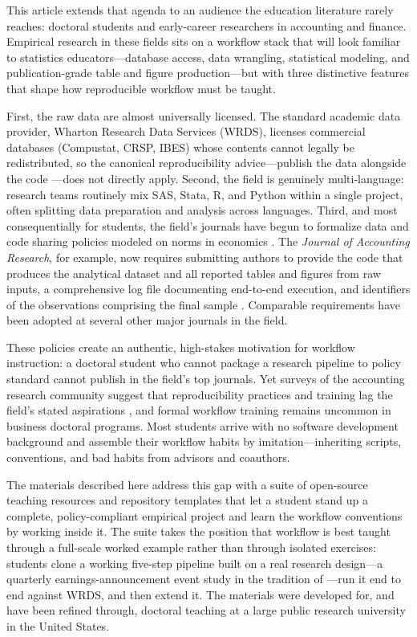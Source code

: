\documentclass[12pt]{article}
\newcommand{\institution}{a large public research university in the United States}
\newcommand{\institution}{the University of Kansas}
\begin{document}
This article extends that agenda to an audience the education literature
rarely reaches: doctoral students and early-career researchers in
accounting and finance. Empirical research in these fields sits on a
workflow stack that will look familiar to statistics educators---database
access, data wrangling, statistical modeling, and publication-grade table
and figure production---but with three distinctive features that shape
how reproducible workflow must be taught.

First, the raw data are almost universally licensed. The standard
academic data provider, Wharton Research Data Services (WRDS), licenses
commercial databases (Compustat, CRSP, IBES) whose contents cannot
legally be redistributed, so the canonical reproducibility
advice---publish the data alongside the code
\citep{peng2011reproducible}---does not directly apply. Second, the field
is genuinely multi-language: research teams routinely mix SAS, Stata, R,
and Python within a single project, often splitting data preparation and
analysis across languages. Third, and most consequentially for students,
the field's journals have begun to formalize data and code sharing
policies modeled on norms in economics
\citep{christensen2018transparency}. The \textit{Journal of Accounting
Research}, for example, now requires submitting authors to provide the
code that produces the analytical dataset and all reported tables and
figures from raw inputs, a comprehensive log file documenting end-to-end
execution, and identifiers of the observations comprising the final
sample \citep{JARpolicy}. Comparable requirements have been adopted at
several other major journals in the field.

These policies create an authentic, high-stakes motivation for workflow
instruction: a doctoral student who cannot package a research pipeline to
policy standard cannot publish in the field's top journals. Yet surveys
of the accounting research community suggest that reproducibility
practices and training lag the field's stated aspirations
\citep{hail2020reproducibility}, and formal workflow training remains
uncommon in business doctoral programs. Most students arrive with no
software development background and assemble their workflow habits by
imitation---inheriting scripts, conventions, and bad habits from advisors
and coauthors.

The materials described here address this gap with a suite of
open-source teaching resources and repository templates that let a
student stand up a complete, policy-compliant empirical project and learn
the workflow conventions by working inside it. The suite takes the
position that workflow is best taught through a full-scale worked example
rather than through isolated exercises: students clone a working
five-step pipeline built on a real research design---a quarterly
earnings-announcement event study in the tradition of
\citet{ballbrown1968}---run it end to end against WRDS, and then extend
it. The materials were developed for, and have been refined through,
doctoral teaching at \institution.
\end{document}
